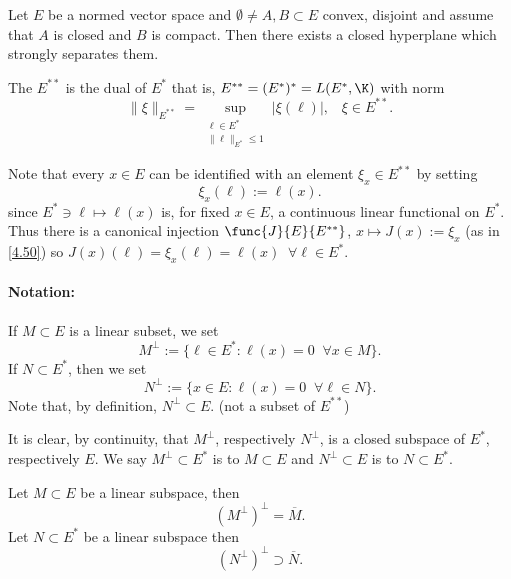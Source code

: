 \begin{thm}\label{iv.22}
    Let $E$ be a normed vector space and $\emptyset\neq A,B\subset E$  convex, disjoint and assume that $A$ is closed and $B$ is compact. Then there exists a closed hyperplane which strongly separates them.
\end{thm}

\begin{definition}\label{iv.23}
    The  $E^{**}$ is the dual of $E^*$ that is, $E^{**}=(E^*)^*=L(E^*,\K)$ with norm
    \[\|\xi\|_{E^{**}}=\sup_{\substack{\ell\in E^*\\\|\ell\|_{E^*}\leq1}}|\xi(\ell)|,\;\;\;\xi\in E^{**}.\tag{4.49}\label{4.49}\]
\end{definition}
Note that every $x\in E$ can be identified with an element $\xi_x\in E^{**}$ by setting
\[\xi_x(\ell):=\ell(x). \tag{4.50}\label{4.50}\]
since $E^*\ni\ell\mapsto\ell(x)$ is, for fixed $x\in E$, 
a continuous linear functional on $E^*$. 
Thus there is a canonical injection $\func{J}{E}{E^{**}}$, 
$x\mapsto J(x):=\xi_x$ (as in \eqref{4.50}) so 
$J(x)(\ell)=\xi_x(\ell)=\ell(x)\;\;\forall\ell\in E^*$.

\paragraph{Notation:}
If $M\subset E$ is a linear subset, we set
\[M^\perp:=\{\ell\in E^*\colon\ell(x)=0\;\;\forall x\in M\}.\tag{4.52}\label{4.52}\]
If $N\subset E^*$, then we set
\[N^\perp:=\{x\in E\colon\ell(x)=0\;\;\forall\ell\in N\}.\tag{4.53}\label{4.53}\]
Note that, by definition, $N^\perp\subset E$. (not a subset of $E^{**}$)

It is clear, by continuity, that $M^\perp$, respectively $N^\perp$, 
is a closed subspace of $E^*$, respectively $E$. We say $M^\perp\subset E^*$ is 
 to $M\subset E$ and $N^\perp\subset E$ is  
to $N\subset E^*$.

\begin{prop}\label{iv.24}
    Let $M\subset E$ be a linear subspace, then 
    \[(M^\perp)^\perp=\overline{M}.\tag{4.54}\label{4.54}\]
    Let $N\subset E^*$ be a linear subspace then
    \[(N^\perp)^\perp\supset\overline{N}.\tag{4.55}\label{4.55}\]
\end{prop}